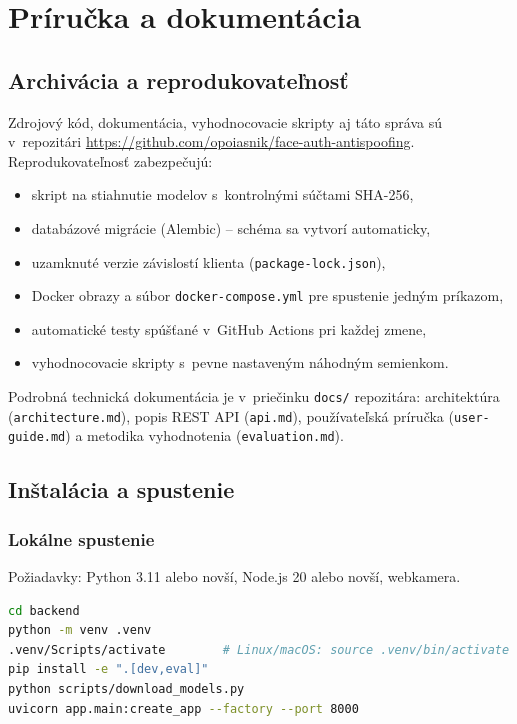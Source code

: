 \chapter{Príručka a dokumentácia}
\label{ch:prirucka}

\section{Archivácia a reprodukovateľnosť}

Zdrojový kód, dokumentácia, vyhodnocovacie skripty aj táto správa sú v~repozitári
\url{https://github.com/opoiasnik/face-auth-antispoofing}. Reprodukovateľnosť
zabezpečujú:
\begin{itemize}
  \item skript na stiahnutie modelov s~kontrolnými súčtami SHA-256,
  \item databázové migrácie (Alembic) -- schéma sa vytvorí automaticky,
  \item uzamknuté verzie závislostí klienta (\texttt{package-lock.json}),
  \item Docker obrazy a súbor \texttt{docker-compose.yml} pre spustenie jedným príkazom,
  \item automatické testy spúšťané v~GitHub Actions pri každej zmene,
  \item vyhodnocovacie skripty s~pevne nastaveným náhodným semienkom.
\end{itemize}

Podrobná technická dokumentácia je v~priečinku \texttt{docs/} repozitára:
architektúra (\texttt{architecture.md}), popis REST API (\texttt{api.md}),
používateľská príručka (\texttt{user-guide.md}) a metodika vyhodnotenia
(\texttt{evaluation.md}).

\section{Inštalácia a spustenie}

\subsection*{Lokálne spustenie}
Požiadavky: Python 3.11 alebo novší, Node.js 20 alebo novší, webkamera.

\begin{lstlisting}[language=bash, caption={Spustenie servera}]
cd backend
python -m venv .venv
.venv/Scripts/activate        # Linux/macOS: source .venv/bin/activate
pip install -e ".[dev,eval]"
python scripts/download_models.py
uvicorn app.main:create_app --factory --port 8000
\end{lstlisting}

